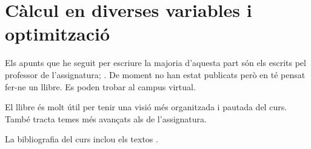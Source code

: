 \documentclass[../segon.tex]{subfiles}
\begin{document}
\part{Càlcul en diverses variables i optimització}



\printbibliography
Els apunts que he seguit per escriure la majoria d'aquesta part són els escrits pel professor de l'assignatura; \cite{ApuntsBrunaEspai, ApuntsBrunaDiff, ApuntsBrunaInt, ApuntsBrunaVect}.
De moment no han estat publicats però en té pensat fer-ne un llibre.
Es poden trobar al campus virtual.

El llibre \cite{apostol1974mathematical} és molt útil per tenir una visió més organitzada i pautada del curs.
També tracta temes més avançats als de l'assignatura.

La bibliografia del curs inclou els textos \cite{MarsdenTrombaCalculoVectorial, WendellFlemingFSoV, BressoudDavidSecondYearCalculus}.
\end{document}
